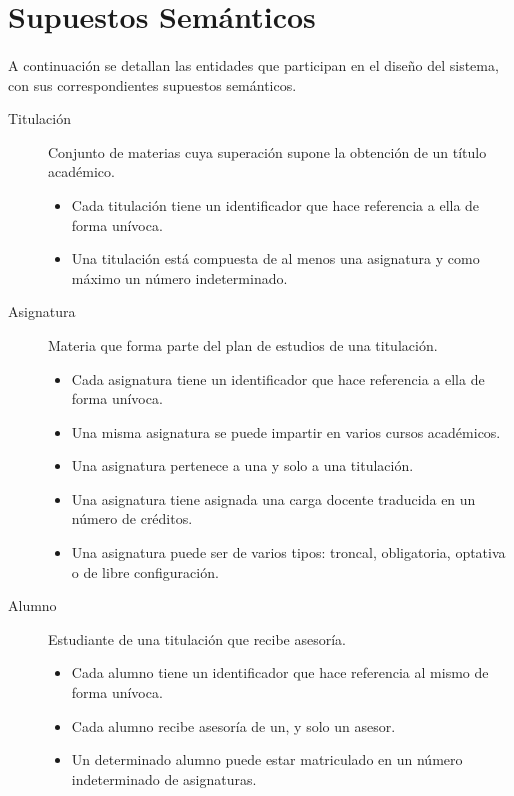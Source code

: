 \section{Supuestos Semánticos}\label{supSem}

   \paragraph{}A continuación se detallan las entidades que participan en el
   diseño del sistema, con sus correspondientes supuestos semánticos.

   \begin{description}

      \item[Titulación] Conjunto de materias cuya superación supone la obtención
      de un título académico.
      \begin{itemize}
         \item Cada titulación tiene un identificador que hace referencia a ella
          de forma unívoca.
          \item Una titulación está compuesta de al menos una asignatura y como
         máximo un número indeterminado.
      \end{itemize}

      \item[Asignatura] Materia que forma parte del plan de estudios de una
      titulación.
      \begin{itemize}
         \item Cada asignatura tiene un identificador que hace referencia a ella
         de forma unívoca.
         \item Una misma asignatura se puede impartir en varios cursos
         académicos.
         \item Una asignatura pertenece a una y solo a una titulación.
         \item Una asignatura tiene asignada una carga docente traducida en
         un número de créditos.
         \item Una asignatura puede ser de varios tipos: troncal, obligatoria,
         optativa o de libre configuración.
      \end{itemize}

      \item[Alumno] Estudiante de una titulación que recibe asesoría.
      \begin{itemize}
         \item Cada alumno tiene un identificador que hace referencia al mismo
         de forma unívoca.
         \item Cada alumno recibe asesoría de un, y solo un asesor.
         \item Un determinado alumno puede estar matriculado en un número
         indeterminado de asignaturas.
      \end{itemize}


\end{description}
